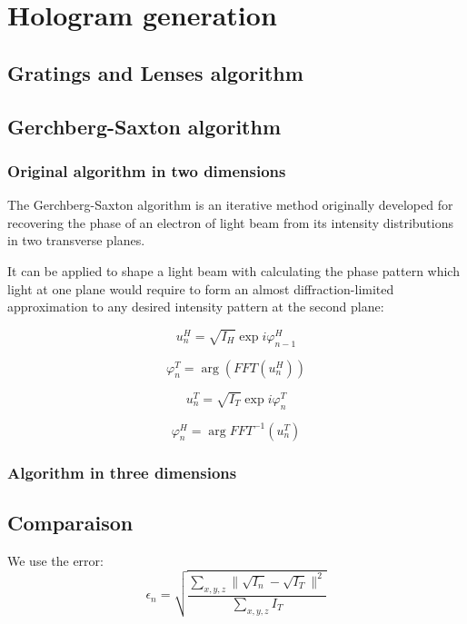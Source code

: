 \documentclass{kepfl}
\begin{document}
\section{Hologram generation}
\subsection{Gratings and Lenses algorithm}

\subsection{Gerchberg-Saxton algorithm}
\subsubsection{Original algorithm in two dimensions}
The Gerchberg-Saxton algorithm is an iterative method originally developed for recovering the phase of an electron of light beam from its intensity distributions in two transverse planes. 

It can be applied to shape a light beam with calculating the phase pattern which light at one plane would require to form an almost diffraction-limited approximation to any desired intensity pattern at the second plane:


\[u_n^H=\sqrt{I_H}\exp{i\varphi_{n-1}^H}\]

\[\varphi_n^T = \arg\left(FFT\left(u_n^H\right)\right)\]

\[u_n^T=\sqrt{I_T}\exp{i\varphi_n^T}\]

\[\varphi_n^H = \arg{FFT^{-1}\left(u_n^T\right)}\]

\subsubsection{Algorithm in three dimensions}

\subsection{Comparaison}
We use the error: 
\[\epsilon_n = \sqrt{\frac{\sum_{x,y,z}\|\sqrt{I_n}-\sqrt{I_T}\|^2}{\sum_{x,y,z}I_T}}\]

\clearpage
%
%








\clearpage
\appendix


\backmatter
	\listoffigures
	\listoftables
\end{document}
